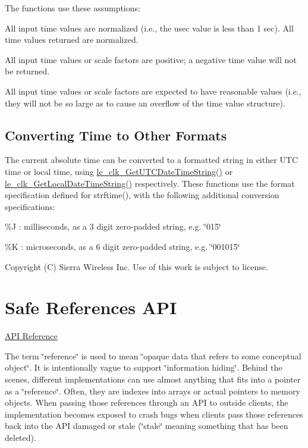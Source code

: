 The functions use these assumptions\+:
\begin{DoxyItemize}
\item All input time values are normalized (i.\+e., the usec value is less than 1 sec). All time values returned are normalized.
\item All input time values or scale factors are positive; a negative time value will not be returned.
\item All input time values or scale factors are expected to have reasonable values (i.\+e., they will not be so large as to cause an overflow of the time value structure).
\end{DoxyItemize}\hypertarget{c_clock_clk_convert}{}\subsection{Converting Time to Other Formats}\label{c_clock_clk_convert}
The current absolute time can be converted to a formatted string in either U\+T\+C time or local time, using \hyperlink{le__clock_8h_a5392b8eb7d45ce86c0842a0a69975059}{le\+\_\+clk\+\_\+\+Get\+U\+T\+C\+Date\+Time\+String()} or \hyperlink{le__clock_8h_a6f37c2a2171eac23ddc306de1fd55f5c}{le\+\_\+clk\+\_\+\+Get\+Local\+Date\+Time\+String()} respectively. These functions use the format specification defined for strftime(), with the following additional conversion specifications\+:
\begin{DoxyItemize}
\item \%J \+: milliseconds, as a 3 digit zero-\/padded string, e.\+g. \char`\"{}015\char`\"{}
\item \%K \+: microseconds, as a 6 digit zero-\/padded string, e.\+g. \char`\"{}001015\char`\"{}
\end{DoxyItemize}





Copyright (C) Sierra Wireless Inc. Use of this work is subject to license. \hypertarget{c_safeRef}{}\section{Safe References A\+P\+I}\label{c_safeRef}
\hyperlink{le__safe_ref_8h}{A\+P\+I Reference}





The term \char`\"{}reference\char`\"{} is used to mean \char`\"{}opaque data that refers to some conceptual object\char`\"{}. It is intentionally vague to support \char`\"{}information hiding\char`\"{}. Behind the scenes, different implementations can use almost anything that fits into a pointer as a \char`\"{}reference\char`\"{}. Often, they are indexes into arrays or actual pointers to memory objects. When passing those references through an A\+P\+I to outside clients, the implementation becomes exposed to crash bugs when clients pass those references back into the A\+P\+I damaged or stale (\char`\"{}stale\char`\"{} meaning something that has been deleted).

